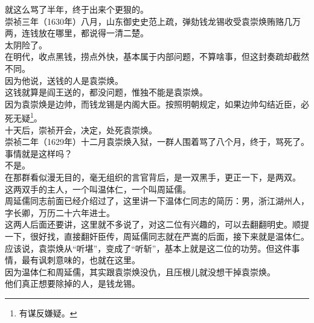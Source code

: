 \begin{multicols}{\theparacolNo}
就这么骂了半年，终于出来个更狠的。\\

崇祯三年（1630年）八月，山东御史史范上疏，弹劾钱龙锡收受袁崇焕贿赂几万两，连钱放在哪里，都说得一清二楚。\\

太阴险了。\\

在明代，收点黑钱，捞点外快，基本属于内部问题，不算啥事，但这封奏疏却截然不同。\\

因为他说，送钱的人是袁崇焕。\\

这钱就算是阎王送的，都没问题，惟独不能是袁崇焕。\\

因为袁崇焕是边帅，而钱龙锡是内阁大臣。按照明朝规定，如果边帅勾结近臣，必死无疑\footnote{有谋反嫌疑。}。\\

十天后，崇祯开会，决定，处死袁崇焕。\\

崇祯二年（1629年）十二月袁崇焕入狱，一群人围着骂了八个月，终于，骂死了。\\

事情就是这样吗？\\

不是。\\

在那群看似漫无目的，毫无组织的言官背后，是一双黑手，更正一下，是两双。\\

这两双手的主人，一个叫温体仁，一个叫周延儒。\\

周延儒同志前面已经介绍过了，这里讲一下温体仁同志的简历：男，浙江湖州人，字长卿，万历二十六年进士。\\

这两人后面还要讲，这里就不多说了，对这二位有兴趣的，可以去翻翻明史。顺提一下，很好找，直接翻奸臣传，周延儒同志就在严嵩的后面，接下来就是温体仁。\\

应该说，袁崇焕从“听堪”，变成了“听斩”，基本上就是这二位的功劳。但这件事情，最有讽刺意味的，也就在这里。\\

因为温体仁和周延儒，其实跟袁崇焕没仇，且压根儿就没想干掉袁崇焕。\\

他们真正想要除掉的人，是钱龙锡。\\


\end{multicols}

